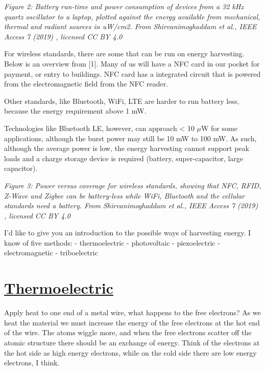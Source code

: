 {
\centering
{}
}

\emph{Figure 2: Battery run-time and power consumption of devices from a
32 kHz quartz oscillator to a laptop, plotted against the energy
available from mechanical, thermal and radiant sources in uW/cm2. From
Shirvanimoghaddam et al., \emph{IEEE Access} 7 (2019)
, licensed CC BY 4.0}

For wireless standards, there are some that can be run on energy
harvesting. Below is an overview from {[}1{]}. Many of us will have a
NFC card in our pocket for payment, or entry to buildings. NFC card has
a integrated circuit that is powered from the electromagnetic field from
the NFC reader.

Other standards, like Bluetooth, WiFi, LTE are harder to run battery
less, because the energy requirement above 1 mW.

Technologies like Bluetooth LE, however, can approach \textless{} 10
\(\mu\)W for some applications, although the burst power may still be 10
mW to 100 mW. As such, although the average power is low, the energy
harvesting cannot support peak loads and a charge storage device is
required (battery, super-capacitor, large capacitor).


{
\centering
{}
}

\emph{Figure 3: Power versus coverage for wireless standards, showing
that NFC, RFID, Z-Wave and Zigbee can be battery-less while WiFi,
Bluetooth and the cellular standards need a battery. From
Shirvanimoghaddam et al., \emph{IEEE Access} 7 (2019)
, licensed CC BY 4.0}

I'd like to give you an introduction to the possible ways of harvesting
energy. I know of five methods: - thermoelectric - photovoltaic -
piezoelectric - electromagnetic - triboelectric

\section{\texorpdfstring{\href{https://en.wikipedia.org/wiki/Thermoelectric_effect}{Thermoelectric}}{Thermoelectric}}\label{thermoelectric}

Apply heat to one end of a metal wire, what happens to the free
electrons? As we heat the material we must increase the energy of the
free electrons at the hot end of the wire. The atoms wiggle more, and
when the free electrons scatter off the atomic structure there should be
an exchange of energy. Think of the electrons at the hot side as high
energy electrons, while on the cold side there are low energy electrons,
I think.

